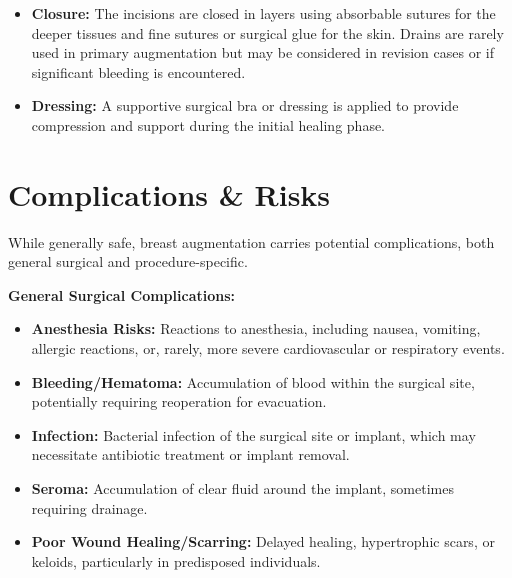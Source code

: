 \begin{itemize}
  \item \textbf{Closure:} The incisions are closed in layers using absorbable sutures for the deeper tissues and fine sutures or surgical glue for the skin. Drains are rarely used in primary augmentation but may be considered in revision cases or if significant bleeding is encountered.
  \item \textbf{Dressing:} A supportive surgical bra or dressing is applied to provide compression and support during the initial healing phase.
\end{itemize}

\section*{Complications \& Risks}
While generally safe, breast augmentation carries potential complications, both general surgical and procedure-specific.

\textbf{General Surgical Complications:}
\begin{itemize}
  \item \textbf{Anesthesia Risks:} Reactions to anesthesia, including nausea, vomiting, allergic reactions, or, rarely, more severe cardiovascular or respiratory events.
  \item \textbf{Bleeding/Hematoma:} Accumulation of blood within the surgical site, potentially requiring reoperation for evacuation.
  \item \textbf{Infection:} Bacterial infection of the surgical site or implant, which may necessitate antibiotic treatment or implant removal.
  \item \textbf{Seroma:} Accumulation of clear fluid around the implant, sometimes requiring drainage.
  \item \textbf{Poor Wound Healing/Scarring:} Delayed healing, hypertrophic scars, or keloids, particularly in predisposed individuals.
\end{itemize}


